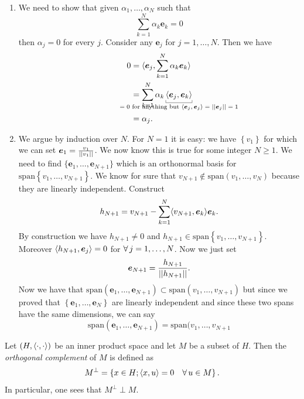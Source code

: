 \documentclass{article}
\begin{document}
\begin{fancyproof}
	\begin{enumerate}
		\item We need to show that given $\alpha_{1},\ldots,\alpha_{N}$ such that
		\begin{equation*}
			\sum_{k=1}^{N}\alpha_{k}\bm{e}_{k}=0
		\end{equation*}
		then $\alpha_{j}=0$ for every $j$. Consider any $\bm{e}_{j}$ for $j=1,\ldots,N$. Then we have
		\begin{align*}
			0&=\inprod{\bm{e}_{j},	\sum_{k=1}^{N}\alpha_{k}\bm{e}_{k}}\\
			&=\sum_{k=1}^{N}\alpha_{k}\ubracketthin{\inprod{\bm{e}_{j},\bm{e}_{k}}}_{\mathclap{\text{$=0$ for anything but $\inprod{\bm{e}_{j},\bm{e}_{j}}=\norm{\bm{e}_{j}}=1$}}}\\
			&=\alpha_{j}.
		\end{align*}
		\item We argue by induction over $N$. For $N=1$ it is easy: we have $\left\{v_{1}\right\}$ for which we can set $\bm{e}_{1}=\frac{v_{1}}{\left|\left|v_{1}\right|\right|}$. We now know this is true for some integer $N\geq1$. We need to find $\{\bm{e}_{1},\ldots,\bm{e}_{N+1}\}$ which is an orthonormal basis for $\mathrm{span}\left\{v_{1},\ldots,v_{N+1}\right\}$. We know for sure that $v_{N+1}\notin\mathrm{span}(v_{1},\ldots,v_{N})$ because they are linearly independent. Construct
		\begin{equation*}
			h_{N+1}=v_{N+1}-\sum_{k=1}^{N}\langle v_{N+1},\bm{e}_{k} \rangle\bm{e}_{k}.
		\end{equation*}
		By construction we have $h_{N+1}\neq0$ and $h_{N+1}\in\mathrm{span}\left\{v_{1},\ldots,v_{N+1}\right\}$. Moreover $\langle h_{N+1},\bm{e}_{j} \rangle=0$ for $\forall\, j=1,\ldots, N$. Now we just set 
		\begin{equation*}
			\bm{e}_{N+1}=\frac{h_{N+1}}{\left|\left|h_{N+1}\right|\right|}.
		\end{equation*}
		Now we have that $\mathrm{span}(\bm{e}_{1},\ldots,\bm{e}_{N+1})\subset\mathrm{span}(v_{1},\ldots,v_{N+1})$ but since we proved that $\left\{\bm{e}_{1},\ldots,\bm{e}_{N}\right\}$ are linearly independent and since these two spans have the same dimensions, we can say
		\begin{equation*}
			\mathrm{span}(\bm{e}_{1},\ldots,\bm{e}_{N+1})=\mathrm{span}(v_{1},\ldots,v_{N+1}
		\end{equation*}
	\end{enumerate}
\end{fancyproof}
\begin{definition}
	Let $\left(H,\langle \cdot,\cdot \rangle\right)$ be an inner product space and let $M$ be a subset of $H$. Then the \emph{orthogonal complement} of $M$ is defined as
	\begin{equation*}
		M^{\perp}=\left\{x\in H; \langle x,u \rangle=0\quad\forall\, u\in M\right\}.
	\end{equation*}
	In particular, one sees that $M^{\perp}\perp M$.
\end{definition}
\end{document}
